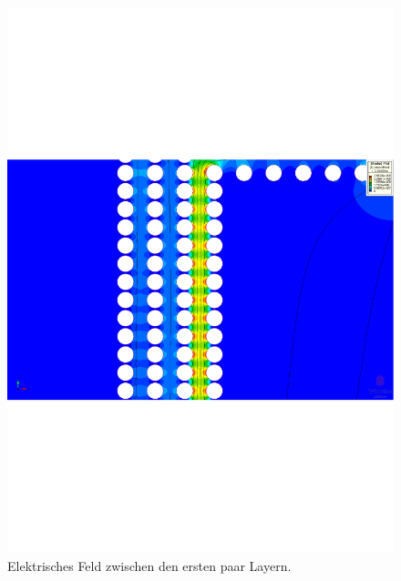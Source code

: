 \begin{refsection}
\begin{figure}
	\centering
	\includegraphics[width=\textwidth]{./trafo/images/BIL_VoltageTrans.pdf}
	\caption{Elektrisches Feld zwischen den ersten paar Layern.}
	\label{trafo:E-Field}
\end{figure}


\end{refsection}
